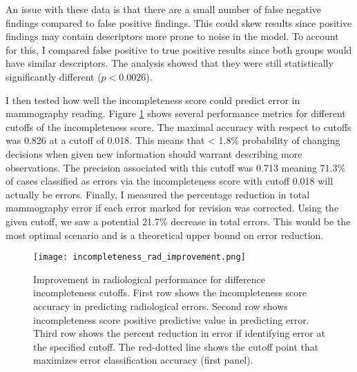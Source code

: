 An issue with these data is that there are a small number of false negative findings compared to false positive findings. This could skew results since positive findings may contain descriptors more prone to noise in the model. To account for this, I compared false positive to true positive results since both groups would have similar descriptors. The analysis showed that they were still statistically significantly different ($p<0.0026$).

\clearpage

I then tested how well the incompleteness score could predict error in mammography reading. Figure \ref{fig:incompleteness_rad_improvement} shows several performance metrics for different cutoffs of the incompleteness score. The maximal accuracy with respect to cutoffs was 0.826 at a cutoff of 0.018. This means that < 1.8\% probability of changing decisions when given new information should warrant describing more observations. The precision associated with this cutoff was 0.713 meaning 71.3\% of cases classified as errors via the incompleteness score with cutoff 0.018 will actually be errors. Finally, I measured the percentage reduction in total mammography error if each error marked for revision was corrected. Using the given cutoff, we saw a potential 21.7\% decrease in total errors. This would be the most optimal scenario and is a theoretical upper bound on error reduction.

\begin{figure}[h]
\centering
\texttt{[image: incompleteness\_rad\_improvement.png]}
\caption[Radiological improvement with incompleteness scores]{Improvement in radiological performance for difference incompleteness cutoffs. First row shows the incompleteness score accuracy in predicting radiological errors. Second row shows incompleteness score positive predictive value in predicting error. Third row shows the percent reduction in error if identifying error at the specified cutoff. The red-dotted line shows the cutoff point that maximizes error classification accuracy (first panel).}
\label{fig:incompleteness_rad_improvement}
\end{figure}
